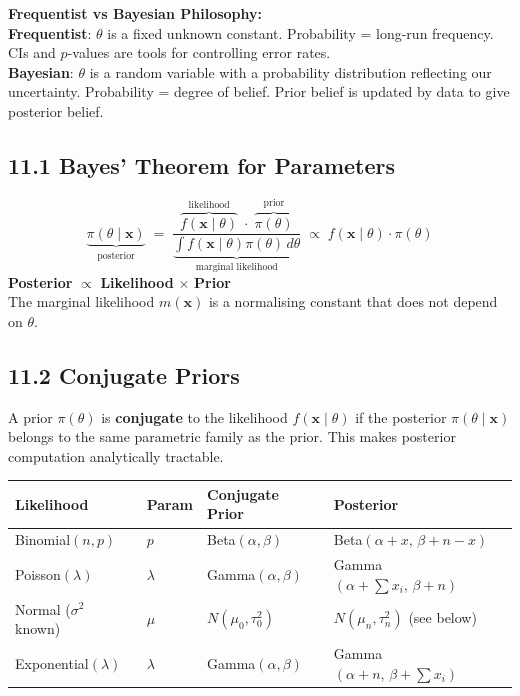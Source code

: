 \documentclass[12pt]{article}
\newcommand{\hcell}[1]{\textbf{\color{white}#1}}
\begin{document}
\bigskip

\begin{keybox}
\textbf{Frequentist vs Bayesian Philosophy:}\\
\textbf{Frequentist}: $\theta$ is a fixed unknown constant. Probability = long-run frequency. CIs and $p$-values are tools for controlling error rates.\\[4pt]
\textbf{Bayesian}: $\theta$ is a random variable with a probability distribution reflecting our uncertainty. Probability = degree of belief. Prior belief is updated by data to give posterior belief.
\end{keybox}

\subsection{11.1 Bayes' Theorem for Parameters}

\begin{thmbox}
\[\underbrace{\pi(\theta\mid\mathbf x)}_{\text{posterior}}\;=\;\frac{\overbrace{f(\mathbf x\mid\theta)}^{\text{likelihood}}\;\cdot\;\overbrace{\pi(\theta)}^{\text{prior}}}{\underbrace{\int f(\mathbf x\mid\theta)\pi(\theta)\,d\theta}_{\text{marginal likelihood}}}\;\propto\; f(\mathbf x\mid\theta)\cdot\pi(\theta)\]
\textbf{Posterior} $\propto$ \textbf{Likelihood} $\times$ \textbf{Prior}\\[4pt]
The marginal likelihood $m(\mathbf x)$ is a normalising constant that does not depend on $\theta$.
\end{thmbox}

\subsection{11.2 Conjugate Priors}

\begin{defbox}
A prior $\pi(\theta)$ is \textbf{conjugate} to the likelihood $f(\mathbf x\mid\theta)$ if the posterior $\pi(\theta\mid\mathbf x)$ belongs to the same parametric family as the prior. This makes posterior computation analytically tractable.
\end{defbox}

\begin{center}{\small
\begin{tabular}{|l|C{1.8cm}|C{3.5cm}|C{3.5cm}|}
\hline{}\hcell{Likelihood}&\hcell{Param}&\hcell{Conjugate Prior}&\hcell{Posterior}\\\hline
Binomial$(n,p)$ & $p$ & Beta$(\alpha,\beta)$ & Beta$(\alpha+x,\,\beta+n-x)$\\\hline
Poisson$(\lambda)$ & $\lambda$ & Gamma$(\alpha,\beta)$ & Gamma$(\alpha+\sum x_i,\,\beta+n)$\\\hline
Normal ($\sigma^2$ known) & $\mu$ & $N(\mu_0,\tau_0^2)$ & $N(\mu_n,\tau_n^2)$ (see below)\\\hline
Exponential$(\lambda)$ & $\lambda$ & Gamma$(\alpha,\beta)$ & Gamma$(\alpha+n,\,\beta+\sum x_i)$\\\hline
\end{tabular}}
\end{center}
\end{document}
